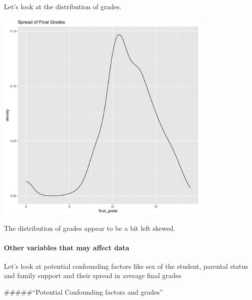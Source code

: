 \documentclass[]{article}
\let\oldparagraph\paragraph
\renewcommand{\paragraph}[1]{\oldparagraph{#1}\mbox{}}
\begin{document}
Let's look at the distribution of grades.

\includegraphics[width=0.8\textwidth,height=\textheight]{images/density_plot_grades.png}

The distribution of grades appear to be a bit left skewed.

\hypertarget{other-variables-that-may-affect-data}{%
\paragraph{Other variables that may affect
data}\label{other-variables-that-may-affect-data}}

Let's look at potential confounding factors like sex of the student,
parental status and family support and their spread in average final
grades

\#\#\#\#\#``Potential Confounding factors and grades''
\end{document}
